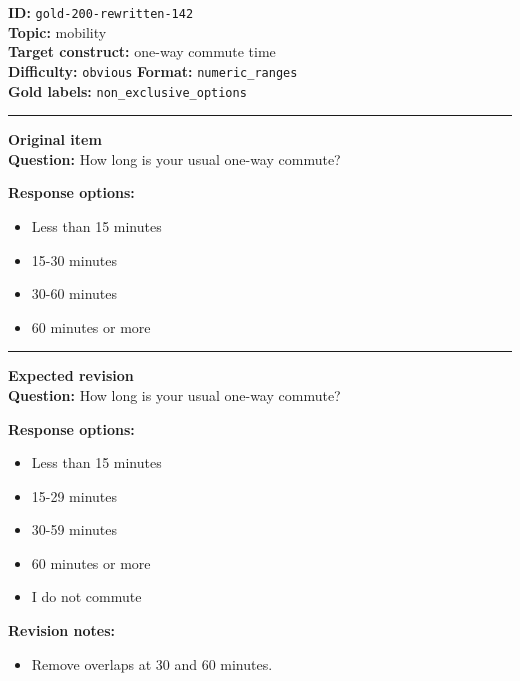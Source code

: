\documentclass[10pt,a4paper]{article}
\newcommand{\sectionline}{\vspace{0.15em}\hrule\vspace{0.35em}}
\begin{document}
\begin{tcolorbox}[colframe=FlawRed,colback=white,colbacktitle=FlawRed!9,coltitle=black,title={Item 142\hfill Flawed item}]
\textbf{ID:} \texttt{gold-200-rewritten-142}\\
\textbf{Topic:} mobility\\
\textbf{Target construct:} one-way commute time\\
\textbf{Difficulty:} \texttt{obvious} \quad \textbf{Format:} \texttt{numeric\_ranges}\\
\textbf{Gold labels:} \texttt{non\_exclusive\_options}\\
\sectionline
\textbf{Original item}\\
\textbf{Question:} How long is your usual one-way commute?
\par\textbf{Response options:}
\begin{itemize}
\item Less than 15 minutes
\item 15-30 minutes
\item 30-60 minutes
\item 60 minutes or more
\end{itemize}
\sectionline
\textbf{Expected revision}\\
\textbf{Question:} How long is your usual one-way commute?
\par\textbf{Response options:}
\begin{itemize}
\item Less than 15 minutes
\item 15-29 minutes
\item 30-59 minutes
\item 60 minutes or more
\item I do not commute
\end{itemize}
\par\textbf{Revision notes:}
\begin{itemize}
\item Remove overlaps at 30 and 60 minutes.
\end{itemize}
\end{tcolorbox}
\end{document}
